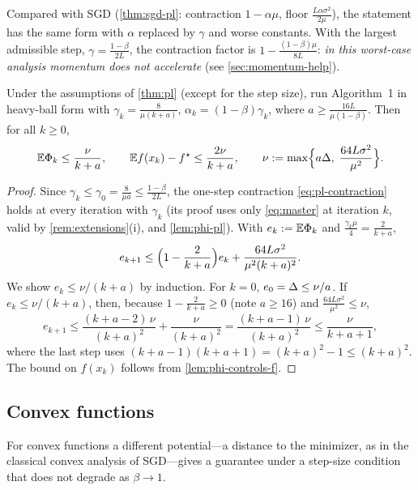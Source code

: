 Compared with SGD (\cref{thm:sgd-pl}: contraction $1-\alpha\mu$, floor
$\frac{L\alpha\sigma^2}{2\mu}$), the statement has the same form with $\alpha$ replaced by
$\gamma$ and worse constants. With the largest admissible step,
$\gamma=\frac{1-\beta}{2L}$, the contraction factor is $1-\frac{(1-\beta)\mu}{8L}$: \emph{in
this worst-case analysis momentum does not accelerate} (see \cref{sec:momentum-help}).

\begin{corollary}\label{cor:pl-decay}
Under the assumptions of \cref{thm:pl} (except for the step size), run Algorithm~1 in
heavy-ball form with $\gamma_k=\frac{8}{\mu(k+a)}$, $\alpha_k=(1-\beta)\gamma_k$, where
$a\ge\frac{16L}{\mu(1-\beta)}$. Then for all $k\ge0$,
\[
  \mathbb{E}\Phi_k\le\frac{\nu}{k+a},\qquad\mathbb{E} f(x_k)-f^\star\le\frac{2\nu}{k+a},\qquad
  \nu:=\max\Bigl\{a\Delta,\;\frac{64L\sigma^2}{\mu^2}\Bigr\}.
\]
\end{corollary}

\begin{proof}
Since $\gamma_k\le\gamma_0=\frac{8}{\mu a}\le\frac{1-\beta}{2L}$, the one-step contraction
\eqref{eq:pl-contraction} holds at every iteration with $\gamma_k$ (its proof uses only
\eqref{eq:master} at iteration $k$, valid by \cref{rem:extensions}(i), and
\cref{lem:phi-pl}). With $e_k:=\mathbb{E}\Phi_k$ and $\frac{\gamma_k\mu}{4}=\frac2{k+a}$,
\[
  e_{k+1}\le\Bigl(1-\frac{2}{k+a}\Bigr)e_k+\frac{64L\sigma^2}{\mu^2(k+a)^2}.
\]
We show $e_k\le\nu/(k+a)$ by induction. For $k=0$, $e_0=\Delta\le\nu/a$. If
$e_k\le\nu/(k+a)$, then, because $1-\frac2{k+a}\ge0$ (note $a\ge16$) and
$\frac{64L\sigma^2}{\mu^2}\le\nu$,
\[
  e_{k+1}\le\frac{(k+a-2)\,\nu}{(k+a)^2}+\frac{\nu}{(k+a)^2}=\frac{(k+a-1)\,\nu}{(k+a)^2}\le\frac{\nu}{k+a+1},
\]
where the last step uses $(k+a-1)(k+a+1)=(k+a)^2-1\le(k+a)^2$. The bound on $f(x_k)$ follows
from \cref{lem:phi-controls-f}.
\end{proof}

\subsection{Convex functions}

For convex functions a different potential---a distance to the minimizer, as in the
classical convex analysis of SGD---gives a guarantee under a step-size condition that
does not degrade as $\beta\to1$.


